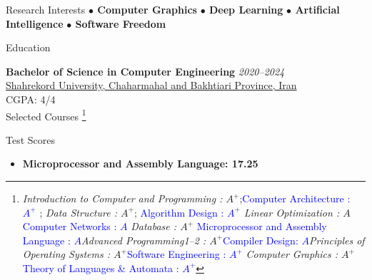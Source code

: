 \documentclass{resume} %
\begin{document}
    \begin{rSection}{Research Interests}
        \textbf{$\bullet$ Computer Graphics} \hspace*{16pt}
        \textbf{$\bullet$ Deep Learning}\hspace*{16pt}
        \textbf{$\bullet$ Artificial Intelligence}\hspace*{16pt}
        \textbf{$\bullet$ Software Freedom}\hspace*{16pt}
    \end{rSection}

    \begin{rSection}{Education}

    {\bf Bachelor of Science in Computer Engineering}
        \hfill {\em 2020--2024} \\
        \href{https://sku.ac.ir}{\textcolor{coolblack}{Shahrekord University, Chaharmahal and Bakhtiari Province, Iran}}\\
        CGPA: 4/4\\
        Selected Courses
        \footnote{\textit{Introduction to Computer and Programming : $A^{+}$};\textcolor{blue}{Computer Architecture : $A^{+}$ }; \textit{Data Structure : $A^{+}$}; \textcolor{blue}{Algorithm Design : $A^{+}$} \textit{Linear Optimization : $A$} \textcolor{blue}{Computer Networks : $A$} \textit{Database : $A^{+}$} \textcolor{blue}{Microprocessor and Assembly Language : $A$}\textit{Advanced Programming1--2 : $A^{+}$}\textcolor{blue}{Compiler Design: $A$}\textit{Principles of Operating Systems : $A^{+}$}\textcolor{blue}{Software Engineering : $A^{+}$} \textit{Computer Graphics : $A^{+}$ }\textcolor{blue}{Theory of Languages & Automata : $A^{+}$}}
        \\
    \end{rSection}

    \begin{rSection}{Test Scores}
        \begin{itemize}{\bfseries}
            \item {\bfseries Microprocessor and Assembly Language: 17.25}
        \end{itemize}
    \end{rSection}
\end{document}
